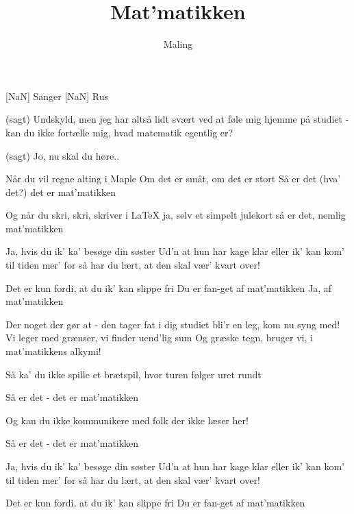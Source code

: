 \documentclass[a4paper,11pt]{article}
\title{Mat'matikken}
\author{Maling}
\begin{document}
\maketitle

\begin{roles}
[NaN] Sanger
[NaN] Rus
\end{roles}

\begin{song}
 (sagt) Undskyld, men jeg har altså lidt svært ved at føle mig hjemme på studiet - kan du ikke fortælle mig, hvad matematik egentlig er?

 (sagt) Jo, nu skal du høre..

 Når du vil regne alting i Maple
Om det er småt, om det er stort
Så er det (hva' det?) det er mat'matikken

 Og når du skri, skri, skriver i LaTeX
ja, selv et simpelt julekort
så er det, nemlig mat'matikken

 Ja, hvis du ik' ka' besøge din søster
Ud'n at hun har kage klar
eller ik' kan kom' til tiden mer' for
så har du lært, at den skal vær' kvart over!

 Det er kun fordi, at du ik' kan slippe fri
Du er fan-get af mat'matikken
Ja, af mat'matikken

 Der noget der gør at - den tager fat i dig
studiet bli'r en leg, kom nu syng med!
Vi leger med grænser, vi finder uend'lig sum
Og græske tegn, bruger vi, i mat'matikkens alkymi!


 Så ka' du ikke spille et brætspil,
hvor turen følger uret rundt

 Så er det - det er mat'matikken

 Og kan du ikke kommunikere
med folk der ikke læser her!

 Så er det - det er mat'matikken

 Ja, hvis du ik' ka' besøge din søster
Ud'n at hun har kage klar
eller ik' kan kom' til tiden mer' for
så har du lært, at den skal vær' kvart over!

 Det er kun fordi, at du ik' kan slippe fri
Du er fan-get af mat'matikken
\end{song}
\end{document}
